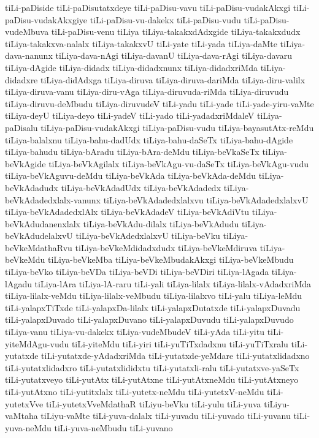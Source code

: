 {tiLi-paDiside
tiLi-paDisutatxdeye
tiLi-paDisu-vavu
tiLi-paDisu-vudakAkxgi
tiLi-paDisu-vudakAkxgiye
tiLi-paDisu-vu-dakekx
tiLi-paDisu-vudu
tiLi-paDisu-vudeMbuva
tiLi-paDisu-venu
tiLiya
tiLiya-takakxdAdxgide
tiLiya-takakxdudx
tiLiya-takakxva-nalalx
tiLiya-takakxvU
tiLi-yate
tiLi-yada
tiLiya-daMte
tiLiya-dava-nanunx
tiLiya-dava-nAgi
tiLiya-davanU
tiLiya-dava-rAgi
tiLiya-davaru
tiLiya-dAgide
tiLiya-didadx
tiLiya-didadxnunx
tiLiya-didadxriMda
tiLiya-didadxre
tiLiya-didAdxga
tiLiya-diruva
tiLiya-diruva-dariMda
tiLiya-diru-valilx
tiLiya-diruva-vanu
tiLiya-diru-vAga
tiLiya-diruvuda-riMda
tiLiya-diruvudu
tiLiya-diruvu-deMbudu
tiLiya-diruvudeV
tiLi-yadu
tiLi-yade
tiLi-yade-yiru-vaMte
tiLiya-deyU
tiLiya-deyo
tiLi-yadeV
tiLi-yado
tiLi-yadadxriMdaleV
tiLiya-paDisalu
tiLiya-paDisu-vudakAkxgi
tiLiya-paDisu-vudu
tiLiya-bayasutAtx-reMdu
tiLiya-balalxnu
tiLiya-bahu-dadUdx
tiLiya-bahu-daSeTx
tiLiya-bahu-dAgide
tiLiya-bahudu
tiLiya-bAradu
tiLiya-bAra-deMdu
tiLiya-beVkaSeTx
tiLiya-beVkAgide
tiLiya-beVkAgilalx
tiLiya-beVkAgu-vu-daSeTx
tiLiya-beVkAgu-vudu
tiLiya-beVkAguvu-deMdu
tiLiya-beVkAda
tiLiya-beVkAda-deMdu
tiLiya-beVkAdadudx
tiLiya-beVkAdadUdx
tiLiya-beVkAdadedx
tiLiya-beVkAdadedxlalx-vanunx
tiLiya-beVkAdadedxlalxvu
tiLiya-beVkAdadedxlalxvU
tiLiya-beVkAdadedxlAlx
tiLiya-beVkAdadeV
tiLiya-beVkAdiVtu
tiLiya-beVkAdudanenxlalx
tiLiya-beVkAdu-dilalx
tiLiya-beVkAdudu
tiLiya-beVkAdudelalxvU
tiLiya-beVkAdedxlalxvU
tiLiya-beVku
tiLiya-beVkeMdathaRvu
tiLiya-beVkeMdidadxdudx
tiLiya-beVkeMdiruva
tiLiya-beVkeMdu
tiLiya-beVkeMba
tiLiya-beVkeMbudakAkxgi
tiLiya-beVkeMbudu
tiLiya-beVko
tiLiya-beVDa
tiLiya-beVDi
tiLiya-beVDiri
tiLiya-lAgada
tiLiya-lAgadu
tiLiya-lAra
tiLiya-lA-raru
tiLi-yali
tiLiya-lilalx
tiLiya-lilalx-vAdadxriMda
tiLiya-lilalx-veMdu
tiLiya-lilalx-veMbudu
tiLiya-lilalxvo
tiLi-yalu
tiLiya-leMdu
tiLi-yalapxTiTxde
tiLi-yalapxDa-lilalx
tiLi-yalapxDutatxde
tiLi-yalapxDuvadu
tiLi-yalapxDuvado
tiLi-yalapxDuvano
tiLi-yalapxDuvudu
tiLi-yalapxDuvudo
tiLiya-vanu
tiLiya-vu-dakekx
tiLiya-vudeMbudeV
tiLi-yAda
tiLi-yitu
tiLi-yiteMdAgu-vudu
tiLi-yiteMdu
tiLi-yiri
tiLi-yuTiTxdadxnu
tiLi-yuTiTxralu
tiLi-yutatxde
tiLi-yutatxde-yAdadxriMda
tiLi-yutatxde-yeMdare
tiLi-yutatxlidadxno
tiLi-yutatxlidadxro
tiLi-yutatxlididxtu
tiLi-yutatxli-ralu
tiLi-yutatxve-yaSeTx
tiLi-yutatxveyo
tiLi-yutAtx
tiLi-yutAtxne
tiLi-yutAtxneMdu
tiLi-yutAtxneyo
tiLi-yutAtxno
tiLi-yutitxlalx
tiLi-yutetx-neMdu
tiLi-yutetxV-neMdu
tiLi-yutetxVve
tiLi-yutetxVveMdathaR
tiLiyu-beVku
tiLi-yulu
tiLi-yuva
tiLiyu-vaMtaha
tiLiyu-vaMte
tiLi-yuva-dalalx
tiLi-yuvadu
tiLi-yuvado
tiLi-yuvanu
tiLi-yuva-neMdu
tiLi-yuva-neMbudu
tiLi-yuvano
}
